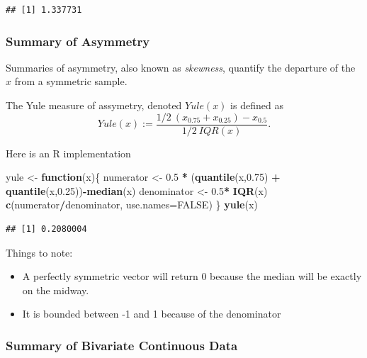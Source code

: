 \documentclass[]{book}
\newenvironment{Shaded}{\begin{snugshade}}{\end{snugshade}}
\newcommand{\KeywordTok}[1]{\textcolor[rgb]{0.13,0.29,0.53}{\textbf{#1}}}
\newcommand{\DataTypeTok}[1]{\textcolor[rgb]{0.13,0.29,0.53}{#1}}
\newcommand{\FloatTok}[1]{\textcolor[rgb]{0.00,0.00,0.81}{#1}}
\newcommand{\StringTok}[1]{\textcolor[rgb]{0.31,0.60,0.02}{#1}}
\newcommand{\OtherTok}[1]{\textcolor[rgb]{0.56,0.35,0.01}{#1}}
\newcommand{\ControlFlowTok}[1]{\textcolor[rgb]{0.13,0.29,0.53}{\textbf{#1}}}
\newcommand{\OperatorTok}[1]{\textcolor[rgb]{0.81,0.36,0.00}{\textbf{#1}}}
\newcommand{\NormalTok}[1]{#1}
\providecommand{\tightlist}{%
  \setlength{\itemsep}{0pt}\setlength{\parskip}{0pt}}
\theoremstyle{definition}
\theoremstyle{definition}
\theoremstyle{definition}
\theoremstyle{remark}
\let\BeginKnitrBlock\begin \let\EndKnitrBlock\end
\begin{document}
\begin{verbatim}
## [1] 1.337731
\end{verbatim}

\subsubsection{Summary of Asymmetry}\label{summary-of-asymmetry}

Summaries of asymmetry, also known as \emph{skewness}, quantify the
departure of the \(x\) from a symmetric sample.

\BeginKnitrBlock{definition}[Yule]
\protect\hypertarget{def:unnamed-chunk-122}{}{\label{def:unnamed-chunk-122}
{} }The Yule measure of assymetry, denoted
\(Yule(x)\) is defined as
\[Yule(x) := \frac{1/2 \: (x_{0.75}+x_{0.25}) - x_{0.5} }{1/2 \: IQR(x)} .\]
\EndKnitrBlock{definition}

Here is an R implementation

\begin{Shaded}
\begin{Highlighting}[]
\NormalTok{yule <-}\StringTok{ }\ControlFlowTok{function}\NormalTok{(x)\{}
\NormalTok{  numerator <-}\StringTok{ }\FloatTok{0.5} \OperatorTok{*}\StringTok{ }\NormalTok{(}\KeywordTok{quantile}\NormalTok{(x,}\FloatTok{0.75}\NormalTok{) }\OperatorTok{+}\StringTok{ }\KeywordTok{quantile}\NormalTok{(x,}\FloatTok{0.25}\NormalTok{))}\OperatorTok{-}\KeywordTok{median}\NormalTok{(x) }
\NormalTok{  denominator <-}\StringTok{ }\FloatTok{0.5}\OperatorTok{*}\StringTok{ }\KeywordTok{IQR}\NormalTok{(x)}
  \KeywordTok{c}\NormalTok{(numerator}\OperatorTok{/}\NormalTok{denominator, }\DataTypeTok{use.names=}\OtherTok{FALSE}\NormalTok{)}
\NormalTok{\}}
\KeywordTok{yule}\NormalTok{(x)}
\end{Highlighting}
\end{Shaded}

\begin{verbatim}
## [1] 0.2080004
\end{verbatim}

Things to note:

\begin{itemize}
\tightlist
\item
  A perfectly symmetric vector will return 0 because the median will be
  exactly on the midway.
\item
  It is bounded between -1 and 1 because of the denominator
\end{itemize}

\subsubsection{Summary of Bivariate Continuous
Data}\label{summary-of-bivariate-continuous-data}
\end{document}
